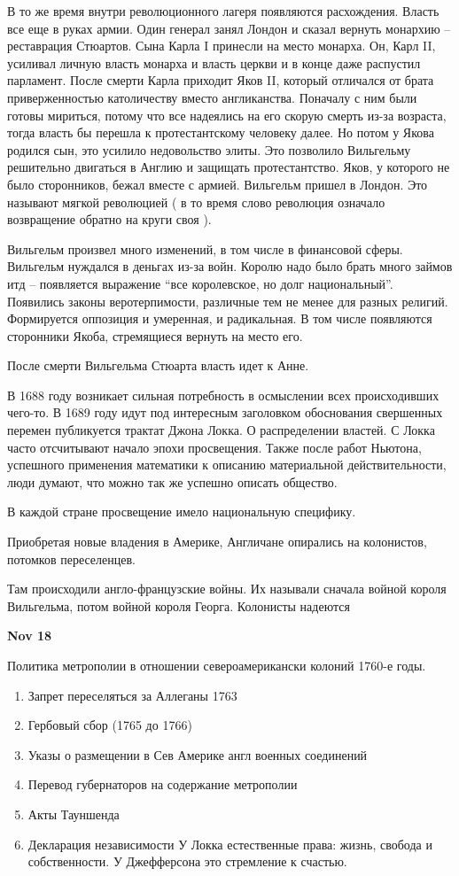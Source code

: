 \documentclass[a4paper, 12pt]{article}
\def\dateis#1{\vspace{\baselineskip}\hfill\textbf{#1}\par}
\begin{document}
\begin{multicols}{2}
В то же время внутри революционного лагеря появляются расхождения. Власть все еще в руках армии. Один генерал занял Лондон и сказал вернуть монархию -- реставрация Стюартов. Сына Карла I принесли на место монарха. Он, Карл II, усиливал личную власть монарха и власть церкви и в конце даже распустил парламент. После смерти Карла приходит Яков II, который отличался от брата приверженностью католичеству вместо англиканства. Поначалу с ним были готовы мириться, потому что все надеялись на его скорую смерть из-за возраста, тогда власть бы перешла к протестантскому человеку далее. Но потом у Якова родился сын, это усилило недовольство элиты. Это позволило Вильгельму решительно двигаться в Англию и защищать протестантство. Яков, у которого не было сторонников, бежал вместе с армией. Вильгельм пришел в Лондон. Это называют мягкой революцией ( в то время слово революция означало возвращение обратно на круги своя ). 

Вильгельм произвел много изменений, в том числе в финансовой сферы. Вильгельм нуждался в деньгах из-за войн. Королю надо было брать много займов итд -- появляется выражение ``все королевское, но долг национальный''. Появились законы веротерпимости, различные тем не менее для разных религий. Формируется оппозиция и умеренная, и радикальная. В том числе появляются сторонники Якоба, стремящиеся вернуть на место его. 

После смерти Вильгельма Стюарта власть идет к Анне. 

В 1688 году возникает сильная потребность в осмыслении всех происходивших чего-то. В 1689 году идут под интересным заголовком обоснования свершенных перемен публикуется трактат Джона Локка. О распределении властей. С Локка часто отсчитывают начало эпохи просвещения. Также после работ Ньютона, успешного применения математики к описанию материальной действительности, люди думают, что можно так же успешно описать общество. 

В каждой стране просвещение имело национальную специфику. 

Приобретая новые владения в Америке, Англичане опирались на колонистов, потомков переселенцев. 

Там происходили англо-французские войны. Их называли сначала войной короля Вильгельма, потом войной короля Георга. Колонисты надеются 

\dateis{Nov 18}

Политика метрополии в отношении североамерикански колоний 1760-е годы. 
\begin{enumerate}
\item Запрет переселяться за Аллеганы 1763
\item Гербовый сбор (1765 до 1766)
\item Указы о размещении в Сев Америке англ военных соединений
\item Перевод губернаторов на содержание метрополии
\item Акты Тауншенда
\item Декларация независимости
  \subitem У Локка естественные права: жизнь, свобода и собственности.
  \subitem У Джефферсона это стремление к счастью.
  

\end{enumerate}
\end{multicols}
\end{document}
